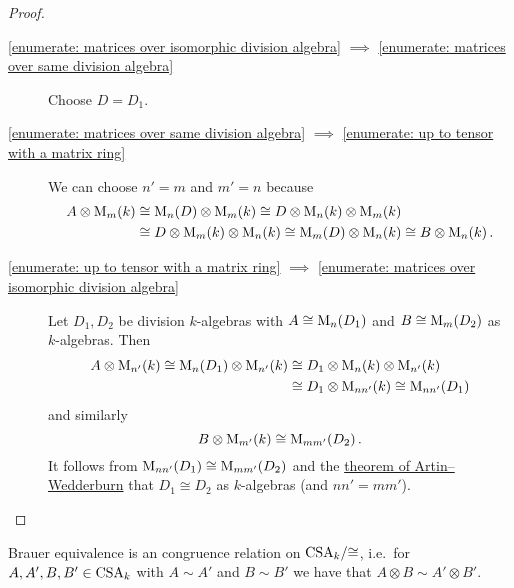 \begin{proof}
  \leavevmode
  \begin{description}
    \item[\ref*{enumerate: matrices over isomorphic division algebra} $\implies$ \ref*{enumerate: matrices over same division algebra}]
      Choose $D = D_1$.
    \item[\ref*{enumerate: matrices over same division algebra} $\implies$ \ref*{enumerate: up to tensor with a matrix ring}]
      We can choose $n' = m$ and $m' = n$ because
      \begin{align*}
              A \otimes \operatorname{M}_m(k)
        &\cong \operatorname{M}_n(D) \otimes \operatorname{M}_m(k)
         \cong D \otimes \operatorname{M}_n(k) \otimes \operatorname{M}_m(k)  \\
        &\cong D \otimes \operatorname{M}_m(k) \otimes \operatorname{M}_n(k)
         \cong \operatorname{M}_m(D) \otimes \operatorname{M}_n(k)
         \cong B \otimes \operatorname{M}_n(k) \,.
      \end{align*}
    \item[\ref*{enumerate: up to tensor with a matrix ring} $\implies$ \ref*{enumerate: matrices over isomorphic division algebra}]
      Let $D_1, D_2$ be division $k$-algebras with $A \cong \operatorname{M}_n(D_1)$ and $B \cong \operatorname{M}_m(D_2)$ as $k$-algebras.
      Then
      \begin{align*}
                A \otimes \operatorname{M}_{n'}(k)
         \cong  \operatorname{M}_n(D_1) \otimes \operatorname{M}_{n'}(k)
        &\cong  D_1 \otimes \operatorname{M}_n(k) \otimes \operatorname{M}_{n'}(k)  \\
        &\cong  D_1 \otimes \operatorname{M}_{nn'}(k)
         \cong  \operatorname{M}_{nn'}(D_1)
      \end{align*}
      and similarly
      \[
              B \otimes \operatorname{M}_{m'}(k)
        \cong \operatorname{M}_{mm'}(D_2) \,.
      \]
      It follows from $\operatorname{M}_{nn'}(D_1) \cong \operatorname{M}_{mm'}(D_2)$ and the \hyperref[theorem: artin wedderburn theorem]{theorem of Artin--Wedderburn} that $D_1 \cong D_2$ as $k$-algebras (and $nn' = mm'$).
    \qedhere
  \end{description}
\end{proof}


\begin{corollary}
  \label{corollary: Brauer equivalence is a congruence relation}
  Brauer equivalence is an congruence relation on $\operatorname{CSA}_k\!/{\cong}$, i.e.\ for $A, A', B, B' \in \operatorname{CSA}_k$ with $A \sim A'$ and $B \sim B'$ we have that $A \otimes B \sim A' \otimes B'$.
\end{corollary}


